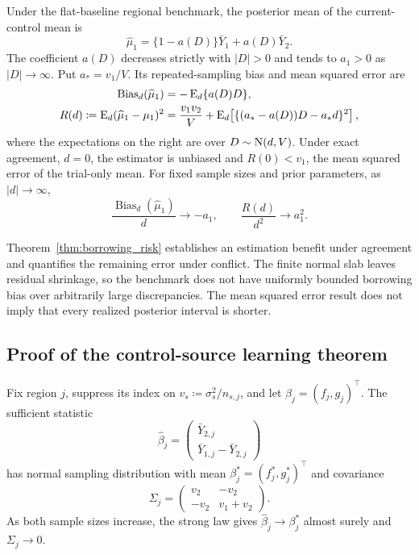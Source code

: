 \begin{theorem}\label{thm:borrowing_risk}
Under the flat-baseline regional benchmark, the posterior mean of the current-control mean is
\begin{equation}\label{eq:regional_estimator}
\widehat\mu_1=\{1-a(D)\}\bar Y_1+a(D)\bar Y_2.
\end{equation}
The coefficient $a(D)$ decreases strictly with $|D|>0$ and tends to $a_1>0$ as $|D|\to\infty$. Put $a_*=v_1/V$. Its repeated-sampling bias and mean squared error are
\begin{equation}\label{eq:regional_risk}
\begin{aligned}
\operatorname{Bias}_d(\widehat\mu_1)&=-\operatorname{E}_d\{a(D)D\},\\
R(d)\coloneqq\operatorname{E}_d(\widehat\mu_1-\mu_1)^2
&=\frac{v_1v_2}{V}
+\operatorname{E}_d\!\left[\{(a_*-a(D))D-a_*d\}^2\right],
\end{aligned}
\end{equation}
where the expectations on the right are over $D\sim\mathrm{N}(d,V)$. Under exact agreement, $d=0$, the estimator is unbiased and $R(0)<v_1$, the mean squared error of the trial-only mean. For fixed sample sizes and prior parameters, as $|d|\to\infty$,
\[
\frac{\operatorname{Bias}_d(\widehat\mu_1)}{d}\longrightarrow-a_1,
\qquad \frac{R(d)}{d^2}\longrightarrow a_1^2.
\]
\end{theorem}
Theorem~\ref{thm:borrowing_risk} establishes an estimation benefit under agreement and quantifies the remaining error under conflict. The finite normal slab leaves residual shrinkage, so the benchmark does not have uniformly bounded borrowing bias over arbitrarily large discrepancies. The mean squared error result does not imply that every realized posterior interval is shorter.

\subsection{Proof of the control-source learning theorem}\label{sec:C.2}
Fix region $j$, suppress its index on $v_s\coloneqq\sigma_s^2/n_{s,j}$, and let $\beta_j=(f_j,g_j)^\top$. The sufficient statistic
\begin{equation}\label{eq:regional_sufficient}
\widehat\beta_j=
\begin{pmatrix}\bar Y_{2,j}\\\bar Y_{1,j}-\bar Y_{2,j}\end{pmatrix}
\end{equation}
has normal sampling distribution with mean $\beta_j^*=(f_j^*,g_j^*)^\top$ and covariance
\begin{equation}\label{eq:regional_sampling_covariance}
\Sigma_j=\begin{pmatrix}v_2&-v_2\\-v_2&v_1+v_2\end{pmatrix}.
\end{equation}
As both sample sizes increase, the strong law gives $\widehat\beta_j\to\beta_j^*$ almost surely and $\Sigma_j\to0$.

